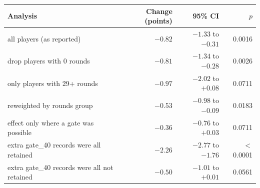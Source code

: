 \begin{tabular}{lrrr}
\toprule
Analysis & Change (points) & 95\% CI & $p$ \\
\midrule
all players (as reported) & $-0.82$ & $-1.33$ to $-0.31$ & 0.0016 \\
drop players with 0 rounds & $-0.81$ & $-1.34$ to $-0.28$ & 0.0026 \\
only players with 29+ rounds & $-0.97$ & $-2.02$ to $+0.08$ & 0.0711 \\
reweighted by rounds group & $-0.53$ & $-0.98$ to $-0.09$ & 0.0183 \\
effect only where a gate was possible & $-0.36$ & $-0.76$ to $+0.03$ & 0.0711 \\
extra gate\_40 records were all retained & $-2.26$ & $-2.77$ to $-1.76$ & $<$0.0001 \\
extra gate\_40 records were all not retained & $-0.50$ & $-1.01$ to $+0.01$ & 0.0561 \\
\bottomrule
\end{tabular}
